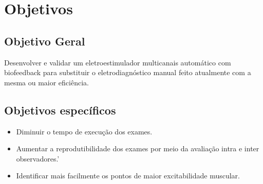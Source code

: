 \section{Objetivos}

\subsection{Objetivo Geral}
Desenvolver e validar um eletroestimulador multicanais automático com biofeedback para  substituir o eletrodiagnóstico manual feito atualmente com a mesma ou maior eficiência.
\subsection{Objetivos específicos}
\begin{itemize}
  \item Diminuir o tempo de execução dos exames.
  \item Aumentar a reprodutibilidade dos exames por meio da avaliação intra e inter observadores.’
  \item Identificar mais facilmente os pontos de maior excitabilidade muscular.
\end{itemize}